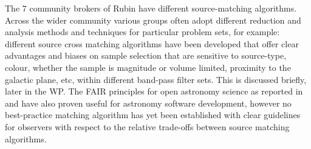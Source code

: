 \documentclass[final,5p,times,twocolumn,authoryear]{elsarticle}
\begin{document}
The 7 community brokers of Rubin have different source-matching \citep{bellm19} algorithms. Across the wider community various groups often adopt different reduction and analysis methods and techniques for particular problem sets, for example: different source cross matching algorithms have been developed that offer clear advantages and biases on sample selection that are sensitive to source-type, colour, whether the sample is magnitude or volume limited, proximity to the galactic plane, etc,  within different band-pass filter sets. This is discussed briefly, later in the WP. The FAIR principles for open astronomy science as reported in \cite{2022arXiv220310710O} and \cite{molinaro21} have also proven useful for astronomy software development, however no best-practice matching algorithm has yet been established with clear guidelines for observers with respect to the relative trade-offs between source matching algorithms.
\end{document}
